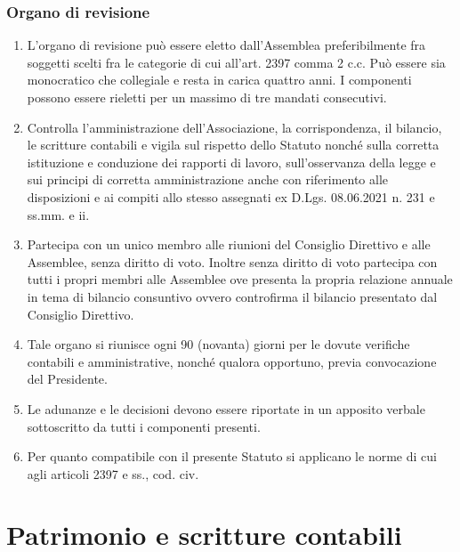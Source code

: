 \documentclass{djtsasddoc}
\begin{document}
	\section{Organo di revisione}
	\begin{enumerate}
			\item L'organo di revisione può essere eletto dall'Assemblea preferibilmente fra soggetti scelti fra le categorie di cui all'art. 2397 comma 2 c.c. Può essere sia monocratico che collegiale e resta in carica quattro   anni. I componenti possono essere rieletti per un massimo di tre mandati consecutivi.
			\item Controlla l'amministrazione dell'Associazione, la corrispondenza, il bilancio, le scritture contabili e vigila sul rispetto dello Statuto nonché sulla corretta istituzione   e conduzione dei rapporti di lavoro, sull'osservanza della legge e  sui principi di corretta amministrazione  anche con riferimento alle disposizioni e ai compiti allo stesso assegnati ex D.Lgs. 08.06.2021 n. 231 e ss.mm. e ii.
			\item Partecipa con un unico membro alle riunioni del Consiglio Direttivo e alle Assemblee, senza diritto di voto. Inoltre senza diritto di voto partecipa con tutti i propri membri alle Assemblee ove presenta la propria relazione annuale in tema di bilancio consuntivo ovvero controfirma il bilancio presentato dal Consiglio Direttivo.
			\item Tale organo si riunisce ogni 90 (novanta) giorni per le dovute verifiche contabili e amministrative, nonché qualora opportuno, previa convocazione del Presidente.
			\item Le adunanze e le decisioni devono essere riportate in un apposito verbale sottoscritto da tutti i componenti presenti.
			\item Per quanto compatibile con il presente Statuto si applicano le norme di cui agli articoli 2397 e ss., cod. civ.
	\end{enumerate}
	
	\part{Patrimonio e scritture contabili}
\end{document}
